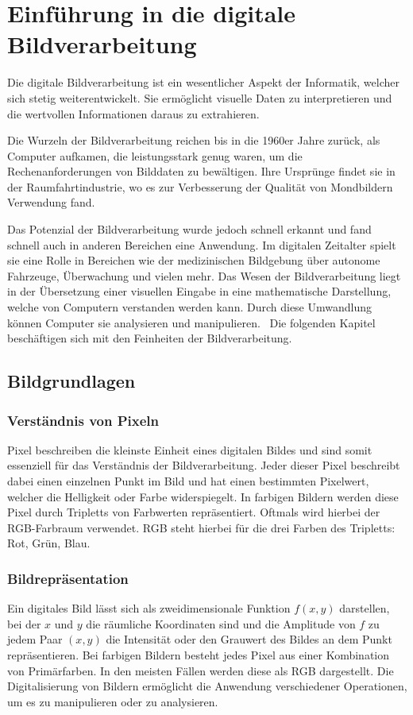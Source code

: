 
\chapter{Einführung in die digitale Bildverarbeitung}
Die digitale Bildverarbeitung ist ein wesentlicher Aspekt der Informatik, welcher sich stetig weiterentwickelt.
Sie ermöglicht visuelle Daten zu interpretieren und die wertvollen Informationen daraus zu extrahieren. 

Die Wurzeln der Bildverarbeitung reichen bis in die 1960er Jahre zurück, als Computer aufkamen, die leistungsstark genug waren, 
um die Rechenanforderungen von Bilddaten zu bewältigen. Ihre Ursprünge findet sie in der Raumfahrtindustrie, wo es zur Verbesserung der
Qualität von Mondbildern Verwendung fand.~\cite{Brian_2017_spacefoundation}

Das Potenzial der Bildverarbeitung wurde jedoch schnell erkannt und fand schnell auch in anderen Bereichen eine Anwendung.
Im digitalen Zeitalter spielt sie eine Rolle in Bereichen wie der medizinischen Bildgebung über autonome Fahrzeuge, Überwachung und vielen mehr.
Das Wesen der Bildverarbeitung liegt in der Übersetzung einer visuellen Eingabe in eine mathematische Darstellung, welche von Computern verstanden werden kann.
Durch diese Umwandlung können Computer sie analysieren und manipulieren.~\cite{Kernel_2023_wikipedia}
Die folgenden Kapitel beschäftigen sich mit den Feinheiten der Bildverarbeitung.  

\section{Bildgrundlagen}

\subsection{Verständnis von Pixeln}
Pixel beschreiben die kleinste Einheit eines digitalen Bildes und sind somit essenziell für das Verständnis der Bildverarbeitung.
Jeder dieser Pixel beschreibt dabei einen einzelnen Punkt im Bild und hat einen bestimmten Pixelwert, welcher die Helligkeit oder Farbe 
widerspiegelt. In farbigen Bildern werden diese Pixel durch Tripletts von Farbwerten repräsentiert. Oftmals wird hierbei der RGB-Farbraum 
verwendet. RGB steht hierbei für die drei Farben des Tripletts: Rot, Grün, Blau.~\cite{J.F._Blinn_2005_ieee}

\subsection{Bildrepräsentation}
Ein digitales Bild lässt sich als zweidimensionale Funktion \(f(x,y)\) darstellen, bei der \(x\) und \(y\) die räumliche Koordinaten sind
und die Amplitude von \(f\) zu jedem Paar \((x,y)\) die Intensität oder den Grauwert des Bildes an dem Punkt repräsentieren.
Bei farbigen Bildern besteht jedes Pixel aus einer Kombination von Primärfarben. In den meisten Fällen werden diese als RGB dargestellt. 
Die Digitalisierung von Bildern ermöglicht die Anwendung verschiedener Operationen, um es zu manipulieren oder zu analysieren. 

